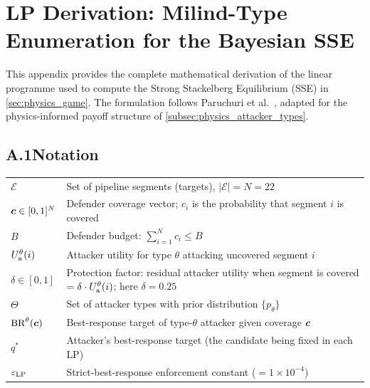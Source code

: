 
\chapter{LP Derivation: Milind-Type Enumeration for the Bayesian SSE}
\label{app:lp}

This appendix provides the complete mathematical derivation of the
linear programme used to compute the Strong Stackelberg Equilibrium
(\acs{SSE}) in \cref{sec:physics_game}.  The formulation follows
Paruchuri et al.~\cite{Paruchuri2008}, adapted for the physics-informed
payoff structure of \cref{subsec:physics_attacker_types}.

\section*{A.1\quad Notation}

\begin{tabular}{@{}p{}p{}@{}}
$\mathcal{E}$ & Set of pipeline segments (targets), $|\mathcal{E}| = N = 22$ \\
$\bm{c} \in [0,1]^N$ & Defender coverage vector; $c_i$ is the probability
  that segment $i$ is covered \\
$B$ & Defender budget: $\sum_{i=1}^N c_i \leq B$ \\
$U_{\mathrm{a}}^\theta(i)$ & Attacker utility for type $\theta$ attacking uncovered
  segment $i$ \\
$\delta \in [0,1]$ & Protection factor: residual attacker utility when
  segment is covered $= \delta \cdot U_{\mathrm{a}}^\theta(i)$; here $\delta = 0.25$ \\
$\Theta$ & Set of attacker types with prior distribution $\{p_\theta\}$ \\
$\mathrm{BR}^\theta(\bm{c})$ & Best-response target of type-$\theta$ attacker
  given coverage $\bm{c}$ \\
$q^*$ & Attacker's best-response target (the candidate being fixed in each LP) \\
$\varepsilon_\mathrm{LP}$ & Strict-best-response enforcement constant
  ($= 1 \times 10^{-4}$) \\
\end{tabular}

\vspace{1em}


